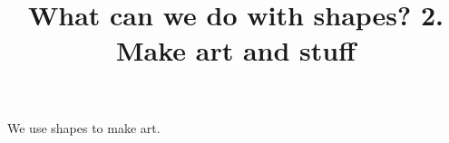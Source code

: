 \documentclass{ximera}
\title{What can we do with shapes? 2. Make art and stuff}
\begin{document}
\begin{abstract}
\end{abstract}
\maketitle

We use shapes to make art.
\end{document}
